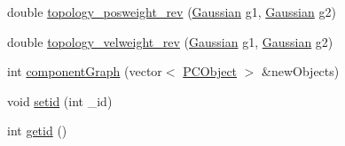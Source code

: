 \begin{DoxyCompactItemize}
\item 
double \hyperlink{class_p_c_object_a81bcc4f7794825ea6fe97c716e7d751e}{topology\-\_\-posweight\-\_\-rev} (\hyperlink{class_gaussian}{\-Gaussian} g1, \hyperlink{class_gaussian}{\-Gaussian} g2)
\item 
double \hyperlink{class_p_c_object_ae6714b4bc945ea46de699bba08e077b2}{topology\-\_\-velweight\-\_\-rev} (\hyperlink{class_gaussian}{\-Gaussian} g1, \hyperlink{class_gaussian}{\-Gaussian} g2)
\item 
int \hyperlink{class_p_c_object_a12dd695b331e394b56f54920c1b93972}{component\-Graph} (vector$<$ \hyperlink{class_p_c_object}{\-P\-C\-Object} $>$ \&new\-Objects)
\item 
void \hyperlink{class_p_c_object_a0f9cc4c246bd5dc449ba900ef203d82e}{setid} (int \-\_\-id)
\item 
int \hyperlink{class_p_c_object_ab5c524d8bf9e73ec56f5d848b026a13e}{getid} ()
\end{DoxyCompactItemize}
